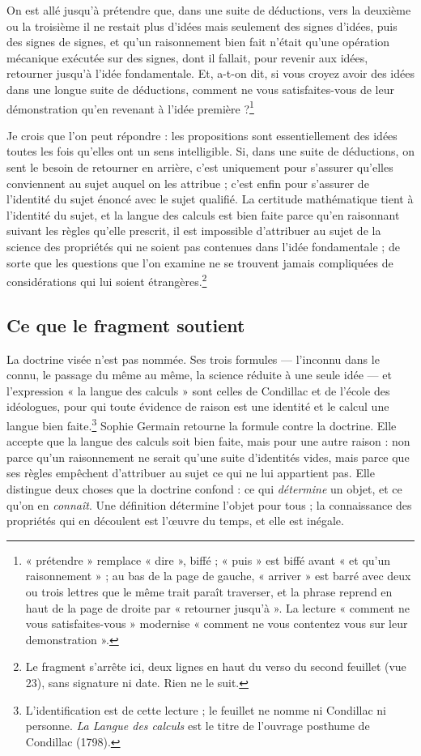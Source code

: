\documentclass[11pt,a4paper]{article}
\begin{document}
On est allé jusqu'à prétendre que, dans une suite de déductions, vers la
deuxième ou la troisième il ne restait plus d'idées mais seulement des signes
d'idées, puis des signes de signes, et qu'un raisonnement bien fait n'était
qu'une opération mécanique exécutée sur des signes, dont il fallait, pour
revenir aux idées, retourner jusqu'à l'idée fondamentale. Et, a-t-on dit, si
vous croyez avoir des idées dans une longue suite de déductions, comment ne
vous satisfaites-vous de leur démonstration qu'en revenant à l'idée
première ?\footnote{« prétendre » remplace « dire », biffé ; « puis » est
biffé avant « et qu'un raisonnement » ; au bas de la page de gauche,
« arriver » est barré avec deux ou trois lettres que le même trait paraît
traverser, et la phrase reprend en haut de la page de droite par « retourner
jusqu'à ». La lecture « comment ne vous satisfaites-vous » modernise « comment
ne vous contentez vous sur leur demonstration ».}

Je crois que l'on peut répondre : les propositions sont essentiellement des
idées toutes les fois qu'elles ont un sens intelligible. Si, dans une suite de
déductions, on sent le besoin de retourner en arrière, c'est uniquement pour
s'assurer qu'elles conviennent au sujet auquel on les attribue ; c'est enfin
pour s'assurer de l'identité du sujet énoncé avec le sujet qualifié. La
certitude mathématique tient à l'identité du sujet, et la langue des calculs
est bien faite parce qu'en raisonnant suivant les règles qu'elle prescrit, il
est impossible d'attribuer au sujet de la science des propriétés qui ne
soient pas contenues dans l'idée fondamentale ; de sorte que les questions
que l'on examine ne se trouvent jamais compliquées de considérations qui lui
soient étrangères.\footnote{Le fragment s'arrête ici, deux lignes en haut du
verso du second feuillet (vue 23), sans signature ni date. Rien ne le suit.}

\subsection*{Ce que le fragment soutient}

La doctrine visée n'est pas nommée. Ses trois formules — l'inconnu dans le
connu, le passage du même au même, la science réduite à une seule idée — et
l'expression « la langue des calculs » sont celles de Condillac et de l'école
des idéologues, pour qui toute évidence de raison est une identité et le
calcul une langue bien faite.\footnote{L'identification est de cette lecture ;
le feuillet ne nomme ni Condillac ni personne. \emph{La Langue des calculs}
est le titre de l'ouvrage posthume de Condillac (1798).} Sophie Germain
retourne la formule contre la doctrine. Elle accepte que la langue des calculs
soit bien faite, mais pour une autre raison : non parce qu'un raisonnement ne
serait qu'une suite d'identités vides, mais parce que ses règles empêchent
d'attribuer au sujet ce qui ne lui appartient pas. Elle distingue deux choses
que la doctrine confond : ce qui \emph{détermine} un objet, et ce qu'on en
\emph{connaît}. Une définition détermine l'objet pour tous ; la connaissance
des propriétés qui en découlent est l'œuvre du temps, et elle est
inégale.
\end{document}
